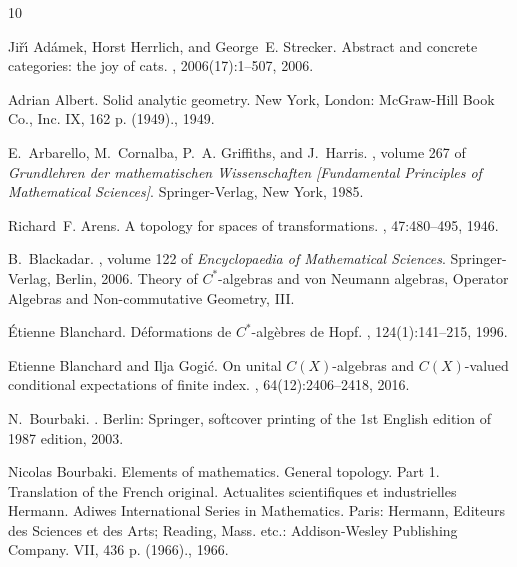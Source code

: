 \documentclass[11pt,leqno]{article}
\theoremstyle{plain}
\theoremstyle{plain}
\theoremstyle{plain}
\numberwithin{equation}{section}
\theoremstyle{nonumberplain}
\newcommand\1{{\bf 1}}
\begin{document}


%


\begin{thebibliography}{10}

Ji{\v{r}}{\'{\i}} Ad{\'a}mek, Horst Herrlich, and George~E. Strecker.
\newblock Abstract and concrete categories: the joy of cats.
, 2006(17):1--507, 2006.

Adrian Albert.
\newblock Solid analytic geometry.
\newblock New {York}, {London}: {McGraw}-{Hill} {Book} {Co}., {Inc}. {IX}, 162
  p. (1949)., 1949.

E.~Arbarello, M.~Cornalba, P.~A. Griffiths, and J.~Harris.
, volume 267 of {\em
  Grundlehren der mathematischen Wissenschaften [Fundamental Principles of
  Mathematical Sciences]}.
\newblock Springer-Verlag, New York, 1985.

Richard~F. Arens.
\newblock A topology for spaces of transformations.
, 47:480--495, 1946.

B.~Blackadar.
, volume 122 of {\em Encyclopaedia of
  Mathematical Sciences}.
\newblock Springer-Verlag, Berlin, 2006.
\newblock Theory of $C^*$-algebras and von Neumann algebras, Operator Algebras
  and Non-commutative Geometry, III.

\'{E}tienne Blanchard.
\newblock D\'{e}formations de {$C^*$}-alg\`ebres de {H}opf.
, 124(1):141--215, 1996.

Etienne Blanchard and Ilja Gogi\'{c}.
\newblock On unital {$C(X)$}-algebras and {$C(X)$}-valued conditional
  expectations of finite index.
, 64(12):2406--2418, 2016.

N.~Bourbaki.
.
\newblock Berlin: Springer, softcover printing of the 1st {English} edition of
  1987 edition, 2003.

Nicolas Bourbaki.
\newblock Elements of mathematics. {General} topology. {Part} 1. {Translation}
  of the {French} original.
\newblock Actualites scientifiques et industrielles {Hermann}. {Adiwes}
  {International} {Series} in {Mathematics}. {Paris}: {Hermann}, {Editeurs} des
  {Sciences} et des {Arts}; {Reading}, {Mass}. etc.: {Addison}-{Wesley}
  {Publishing} {Company}. {VII}, 436 p. (1966)., 1966.


\end{thebibliography}
\end{document}
